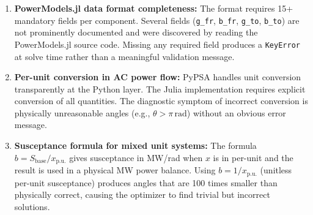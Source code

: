 \begin{enumerate}
    \item \textbf{PowerModels.jl data format completeness:} The format requires 15+ mandatory fields per component. Several fields (\texttt{g\_fr}, \texttt{b\_fr}, \texttt{g\_to}, \texttt{b\_to}) are not prominently documented and were discovered by reading the PowerModels.jl source code. Missing any required field produces a \texttt{KeyError} at solve time rather than a meaningful validation message.

    \item \textbf{Per-unit conversion in AC power flow:} PyPSA handles unit conversion transparently at the Python layer. The Julia implementation requires explicit conversion of all quantities. The diagnostic symptom of incorrect conversion is physically unreasonable angles (e.g., $\theta > \pi\,\text{rad}$) without an obvious error message.

    \item \textbf{Susceptance formula for mixed unit systems:} The formula $b = S_\text{base}/x_\text{p.u.}$ gives susceptance in MW/rad when $x$ is in per-unit and the result is used in a physical MW power balance. Using $b = 1/x_\text{p.u.}$ (unitless per-unit susceptance) produces angles that are 100 times smaller than physically correct, causing the optimizer to find trivial but incorrect solutions.
\end{enumerate}
